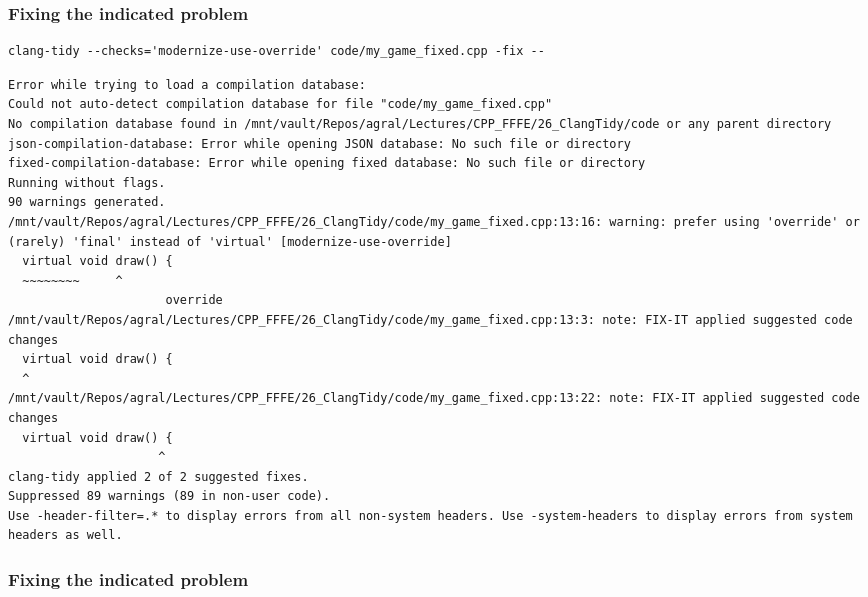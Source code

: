 \documentclass[aspectratio=169]{beamer}
\begin{document}
\begin{frame}[fragile]
  \frametitle{Fixing the indicated problem}
    {\fontsize{8}{6} \begin{lstlisting}[showstringspaces=false]
clang-tidy --checks='modernize-use-override' code/my_game_fixed.cpp -fix --
    \end{lstlisting}}
    {\fontsize{6}{6} \begin{lstlisting}[showstringspaces=false]
Error while trying to load a compilation database:
Could not auto-detect compilation database for file "code/my_game_fixed.cpp"
No compilation database found in /mnt/vault/Repos/agral/Lectures/CPP_FFFE/26_ClangTidy/code or any parent directory
json-compilation-database: Error while opening JSON database: No such file or directory
fixed-compilation-database: Error while opening fixed database: No such file or directory
Running without flags.
90 warnings generated.
/mnt/vault/Repos/agral/Lectures/CPP_FFFE/26_ClangTidy/code/my_game_fixed.cpp:13:16: warning: prefer using 'override' or (rarely) 'final' instead of 'virtual' [modernize-use-override]
  virtual void draw() {
  ~~~~~~~~     ^
                      override
/mnt/vault/Repos/agral/Lectures/CPP_FFFE/26_ClangTidy/code/my_game_fixed.cpp:13:3: note: FIX-IT applied suggested code changes
  virtual void draw() {
  ^
/mnt/vault/Repos/agral/Lectures/CPP_FFFE/26_ClangTidy/code/my_game_fixed.cpp:13:22: note: FIX-IT applied suggested code changes
  virtual void draw() {
                     ^
clang-tidy applied 2 of 2 suggested fixes.
Suppressed 89 warnings (89 in non-user code).
Use -header-filter=.* to display errors from all non-system headers. Use -system-headers to display errors from system headers as well.
    \end{lstlisting}}
\end{frame}

\begin{frame}[fragile]
  \frametitle{Fixing the indicated problem}
  \begin{columns}[T]
    \begin{column}{0.5\textwidth}
      \vspace*{-9pt}%
    {\fontsize{7}{6} \color{black}{}}%
      \vspace{-12pt}{\color{clTwelveBitGreen}\rule{\linewidth}{2pt}}
    \end{column}

    \begin{column}{0.5\textwidth}
      \vspace*{-9pt}%
    {\fontsize{7}{6} \color{black}{}}%
      \vspace{-12pt}{\color{clTwelveBitViolet}\rule{\linewidth}{2pt}}
    \end{column}
  \end{columns}
\end{frame}
\end{document}
